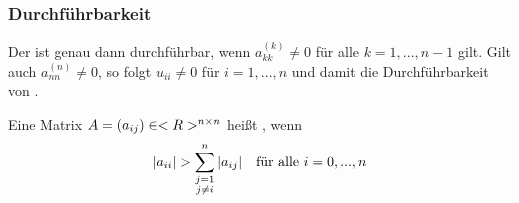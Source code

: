 \subsubsection*{Durchführbarkeit}

Der  ist genau dann durchführbar, wenn $a_{kk}^{(k)}\neq 0$ für alle $k=1,...,n-1$ gilt. Gilt auch $a_{nn}^{(n)}\neq 0$, so folgt $u_{ii}\neq 0$ für $i=1,...,n$ und damit die Durchführbarkeit von .

\begin{definition}
	Eine Matrix $A=(a_{ij})\in<R>^{n\times n}$ heißt , wenn
	\begin{align}
		\vert a_{ii}\vert > \sum_{\substack{j=1\\ j\neq i}}^{n}\vert a_{ij}\vert\quad\text{für alle } i=0,...,n\notag
	\end{align}
\end{definition}

